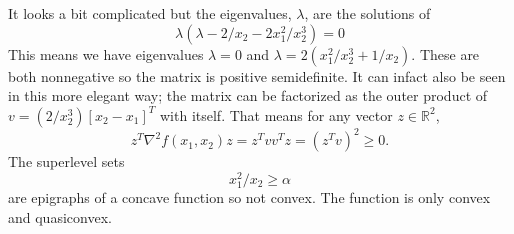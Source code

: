 \begin{enumerate}[label=(\alph*)]
\[    \]
    It looks a bit complicated but the eigenvalues, $\lambda$, are the solutions of
    \[
        \lambda(\lambda - 2/x_2 - 2x_1^2/x_2^3) = 0
    \]
    This means we have eigenvalues $\lambda = 0$ and $\lambda = 2(x_1^2/x_2^3 + 1/x_2)$.
    These are both nonnegative so the matrix is positive semidefinite.
    It can infact also be seen in this more elegant way; the matrix can be factorized as the outer product of $v = (2/x^3_2)[x_2 - x_1]^T$ with itself.
    That means for any vector $z \in \mathbb{R}^2$, 
    \[
        z^T\nabla^2 f(x_1, x_2)z = z^T v v^T z = (z^T v)^2 \geq 0.
    \]
    The superlevel sets
    \[
        x^2_1/x_2 \geq \alpha
    \]
    are epigraphs of a concave function so not convex.
    The function is only convex and quasiconvex.
\end{enumerate}